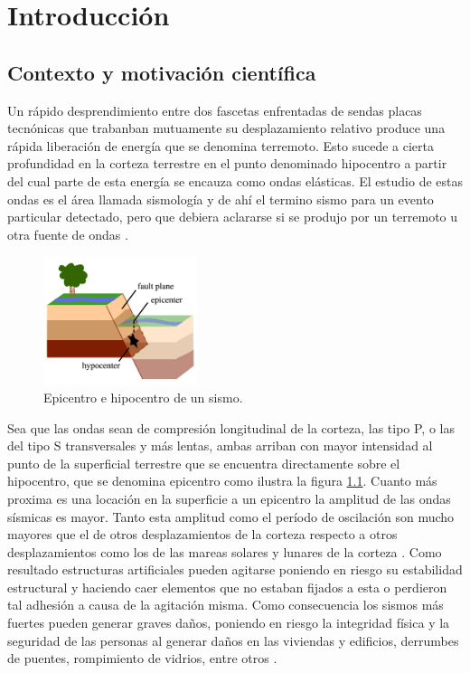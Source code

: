 \documentclass[a4paper]{report}
\begin{document}
\tableofcontents


\chapter{Introducción}

\section{Contexto y motivación científica}\label{sec:contexto}

Un rápido desprendimiento entre dos fascetas enfrentadas de sendas placas tecnónicas que trabanban mutuamente su desplazamiento relativo produce una rápida liberación de energía que se denomina terremoto.
Esto sucede a cierta profundidad en la corteza terrestre en el punto denominado hipocentro a partir del cual parte de esta energía se encauza como ondas elásticas.
El estudio de estas ondas es el área llamada sismología y de ahí el termino sismo para un evento particular detectado, pero que debiera aclararse si se produjo por un terremoto u otra fuente de ondas \cite[sección 4.1.1]{fowler_solid_1990}.
\begin{figure}
  \centering
	\includegraphics[width=0.4\textwidth]{eq-ed-fault-labeled.png}
	\caption{Epicentro e hipocentro de un sismo.}
	\label{fig:epicentro_hipocentro}
\end{figure}
Sea que las ondas sean de compresión longitudinal de la corteza, las tipo P, o las del tipo S transversales y más lentas, ambas arriban con mayor intensidad al punto de la superficial terrestre que se encuentra directamente sobre el hipocentro, que se denomina epicentro \cite[sección 4.1.2]{fowler_solid_1990} como ilustra la figura \ref{fig:epicentro_hipocentro}.
Cuanto más proxima es una locación en la superficie a un epicentro la amplitud de las ondas sísmicas es mayor.
Tanto esta amplitud como el período de oscilación son mucho mayores que el de otros desplazamientos de la corteza respecto a otros desplazamientos como los de las mareas solares y lunares de la corteza \cite[sección 4.1.4]{fowler_solid_1990}.
Como resultado estructuras artificiales pueden agitarse poniendo en riesgo su estabilidad estructural y haciendo caer elementos que no estaban fijados a esta o perdieron tal adhesión a causa de la agitación misma.
Como consecuencia los sismos más fuertes pueden generar graves daños, poniendo en riesgo la integridad física y la seguridad de las personas al generar daños en las viviendas y edificios, derrumbes de puentes, rompimiento de vidrios, entre otros \cite{noauthor_que_2018}.
\end{document}
